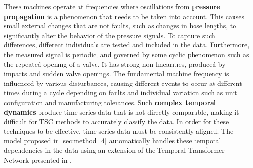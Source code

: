 



These machines operate at frequencies where oscillations from \textbf{pressure propagation} is a phenomenon that needs to be taken into account. 
This causes small external changes that are not faults, such as changes in hose lengths, to significantly alter the behavior of the pressure signals. To capture such differences, different individuals are tested and included in the data. 
Furthermore, the measured signal is periodic, and governed by some cyclic phenomenon such as the repeated opening of a valve. It has strong non-linearities, produced by impacts and sudden valve openings. The fundamental machine frequency is influenced by various disturbances, causing different events to occur at different times during a cycle depending on faults and individual variation such as unit configuration and manufacturing tolerances.
Such \textbf{complex temporal dynamics} produce time series data that is not directly comparable, making it difficult for TSC methods to accurately classify the data. In order for these techniques to be effective, time series data must be consistently aligned. The model proposed in \cref{sec:method_4} automatically handles these temporal dependencies in the data using an extension of the Temporal Transformer Network presented in \cite{martinez2022closed}.

